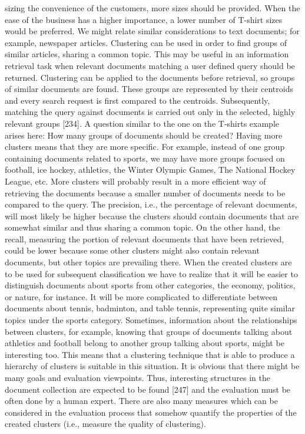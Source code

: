 \documentclass[11pt,openany,executivepaper]{book}
\begin{document}
sizing the convenience of the customers, more sizes should be provided. When
the ease of the business has a higher importance, a lower number of T-shirt sizes
would be preferred.
We might relate similar considerations to text documents; for example, newspaper articles. Clustering can be used in order to find groups of similar articles,
sharing a common topic. This may be useful in an information retrieval task
when relevant documents matching a user defined query should be returned.
Clustering can be applied to the documents before retrieval, so groups of similar documents are found. These groups are represented by their centroids and
every search request is first compared to the centroids. Subsequently, matching
the query against documents is carried out only in the selected, highly relevant
groups [234]. A question similar to the one on the T-shirts example arises here:
How many groups of documents should be created?
Having more clusters means that they are more specific. For example, instead
of one group containing documents related to sports, we may have more groups
focused on football, ice hockey, athletics, the Winter Olympic Games, The National Hockey League, etc. More clusters will probably result in a more efficient
way of retrieving the documents because a smaller number of documents needs
to be compared to the query. The precision, i.e., the percentage of relevant documents, will most likely be higher because the clusters should contain documents
that are somewhat similar and thus sharing a common topic. On the other hand,
the recall, measuring the portion of relevant documents that have been retrieved,
could be lower because some other clusters might also contain relevant documents, but other topics are prevailing there.
When the created clusters are to be used for subsequent classification we
have to realize that it will be easier to distinguish documents about sports from
other categories, the economy, politics, or nature, for instance. It will be more
complicated to differentiate between documents about tennis, badminton, and
table tennis, representing quite similar topics under the sports category.
Sometimes, information about the relationships between clusters, for example, knowing that groups of documents talking about athletics and football belong
to another group talking about sports, might be interesting too. This means that
a clustering technique that is able to produce a hierarchy of clusters is suitable in
this situation.
It is obvious that there might be many goals and evaluation viewpoints. Thus,
interesting structures in the document collection are expected to be found [247]
and the evaluation must be often done by a human expert. There are also many
measures which can be considered in the evaluation process that somehow quantify the properties of the created clusters (i.e., measure the quality of clustering).
\end{document}
